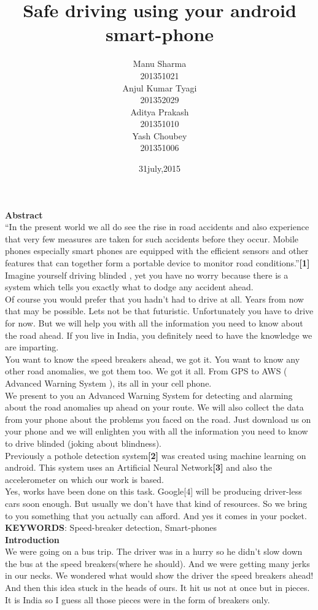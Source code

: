 \documentclass[12pt]{report}
\title{\textbf{Safe driving using your android smart-phone}}
\author{
        Manu Sharma\\201351021\\Anjul Kumar Tyagi\\201352029\\Aditya Prakash\\201351010\\Yash Choubey\\201351006
		}
\date{31july,2015}
\begin{document}
\maketitle
\textbf{Abstract}\\
“In the present world we all do see the rise in road accidents and also experience that very few measures are taken for such accidents before they occur. Mobile phones especially smart phones are equipped with the efficient sensors and other features that can together form a portable device to monitor road conditions.”\textbf{[1]}\\
Imagine yourself driving blinded , yet you have no worry because there is a system which tells you exactly what to dodge any accident ahead.\\
Of course you would prefer that you hadn't had to drive at all. Years from now that may be possible. Lets not be that futuristic. Unfortunately you have to drive for now. But we will help you with all the information you need to know about the road ahead. If you live in India, you definitely need to have the knowledge we are imparting.\\
You want to know the speed breakers ahead, we got it. You want to know any other road anomalies, we got them too. We got it all. From GPS to AWS ( Advanced Warning System ), its all in your cell phone.\\
We present to you an Advanced Warning System for detecting and alarming about the road anomalies up ahead on your route. We will also collect the data from your phone about the problems you faced on the road.
Just download us on your phone and we will enlighten you with all the information you need to know to drive blinded (joking about blindness).\\
Previously a pothole detection system\textbf{[2]} was created using machine learning on android. This system uses an Artificial Neural Network\textbf{[3]} and also the accelerometer on which our work is based.\\
Yes, works have been done on this task. Google[4] will be producing driver-less cars soon enough. But usually we don't have that kind of resources. So we bring to you something that you actually can afford. And yes it comes in your pocket.\\
\textbf{KEYWORDS}: Speed-breaker detection, Smart-phones\\
\textbf{Introduction}\\
We were going on a bus trip. The driver was in a hurry so he didn't slow down the bus at the speed breakers(where he should). And we were getting many jerks in our necks. We wondered what would show the driver the speed breakers ahead! And then this idea stuck in the heads of ours. It hit us not at once but in pieces. It is India so I guess all those pieces were in the form of breakers only.\\
\end{document}
